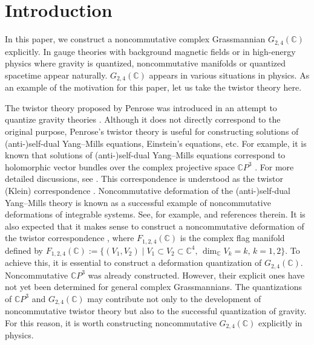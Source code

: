 \documentclass[pdftex]{sigma}
\numberwithin{equation}{section}
\begin{document}


\section{Introduction}
\label{G24_introduction}

In this paper, we construct a noncommutative complex Grassmannian $G_{2,4}(\mathbb{C})$ explicitly.
In gauge theories with background magnetic fields or in high-energy physics where gravity is quantized, %
noncommutative manifolds or quantized spacetime appear naturally. $G_{2,4}(\mathbb{C})$ appears in various situations in physics. As an example of the motivation for this paper, let us take the twistor theory here.

The twistor theory proposed by Penrose was introduced in an attempt to quantize gravity theories \cite{Pen1,Pen2,Pen3}. Although it does not directly correspond to the original purpose, %
Penrose's twistor theory is useful for constructing solutions of (anti-)self-dual Yang--Mills equations, Einstein's equations, etc. For example, it is known that solutions of (anti-)self-dual Yang--Mills equations correspond to holomorphic vector bundles over the complex projective space $\mathbb{C}P^{3}$ \cite{Pen1,Pen2,Pen3,Ward1,WaWe}.
For more detailed discussions, see \cite{MW,WaWe}. This correspondence is understood as the twistor (Klein) correspondence . Noncommutative deformation of the (anti-)self-dual Yang--Mills theory is known as a successful example of noncommutative deformations of integrable systems.
See, for example, \cite{Hama1,HaNa1,NS} and references therein.
It is also expected that it makes sense to construct a noncommutative deformation of the twistor correspondence ,
where $F_{1,2,4}(\mathbb{C})$ is the complex flag manifold defined by
$F_{1,2,4}(\mathbb{C})
:=\{(V_{1},V_{2})\mid
V_{1}
\subset
V_{2}
\subset
\mathbb{C}^{4},\,
\dim_{\mathbb{C}}
V_{k}
=
k,\,
k=1,2
\} $.
To achieve this, it is essential to construct a deformation quantization of $G_{2,4}(\mathbb{C})$. Noncommutative $\mathbb{C}P^{3}$ was already constructed. However, their explicit ones have not yet been determined for general complex Grassmannians. The quantizations of $\mathbb{C}P^{3}$ and $G_{2,4}(\mathbb{C})$ may contribute not only to the development of noncommutative twistor theory but also to the successful quantization of gravity.
For this reason, it is worth constructing noncommutative $G_{2,4}(\mathbb{C})$ explicitly in physics.
\end{document}

